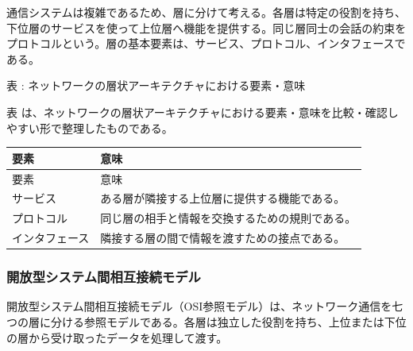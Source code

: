 通信システムは複雑であるため、層に分けて考える。各層は特定の役割を持ち、下位層のサービスを使って上位層へ機能を提供する。同じ層同士の会話の約束をプロトコルという。層の基本要素は、サービス、プロトコル、インタフェースである。

\par\smallskip\noindent{}\label{tab:ch16-23}表 \thetable: ネットワークの層状アーキテクチャにおける要素・意味\par\smallskip
表 \thetable は、ネットワークの層状アーキテクチャにおける要素・意味を比較・確認しやすい形で整理したものである。\par\smallskip
\begin{longtable}{>{\raggedright\arraybackslash}p{}>{\raggedright\arraybackslash}p{}}
\toprule
要素 & 意味 \\
\midrule
\endfirsthead
\toprule
要素 & 意味 \\
\midrule
\endhead
サービス & ある層が隣接する上位層に提供する機能である。 \\
プロトコル & 同じ層の相手と情報を交換するための規則である。 \\
インタフェース & 隣接する層の間で情報を渡すための接点である。 \\
\bottomrule
\end{longtable}

\subsubsection{開放型システム間相互接続モデル}

開放型システム間相互接続モデル（OSI参照モデル）は、ネットワーク通信を七つの層に分ける参照モデルである。各層は独立した役割を持ち、上位または下位の層から受け取ったデータを処理して渡す。

